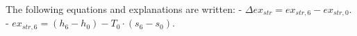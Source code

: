 The following equations and explanations are written:  
- \( \Delta ex_{str} = ex_{str,6} - ex_{str,0} \).  
- \( ex_{str,6} = (h_6 - h_0) - T_0 \cdot (s_6 - s_0) \).